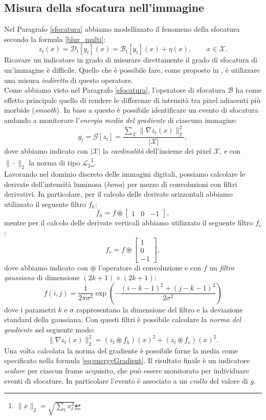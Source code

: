 \subsection{Misura della sfocatura nell'immagine}
Nel Paragrafo \ref{sfocatura} abbiamo modellizzato il fenomeno della sfocatura secondo la formula \eqref{blur_multi}:
\[z_t(x)=\mathcal{D}_t[y_t](x) = \mathcal{B}_t[y_t](x) + \eta(x), \qquad x \in \mathcal{X}.\]
Ricavare un indicatore in grado di misurare direttamente il grado di sfocatura di un'immagine \`e difficile.
Quello che \`e possibile fare, come proposto in \cite{alippi2010detecting}, \`e utilizzare una misura \textit{indiretta} di questo operatore.\\
Come abbiamo visto nel Paragrafo \ref{sfocatura}, l'operatore di sfocatura $\mathcal{B}$ ha come effetto principale quello di rendere le differenze di intensit\`a tra pixel adiacenti pi\`u morbide (\textit{smooth}).
In base a questo \`e possibile identificare un evento di sfocatura andando a monitorare l'\textit{energia media del gradiente} di ciascuna immagine:
\begin{equation}
\label{eq:energyGradient}
g_t = \mathcal{G}[z_t] =\frac{\sum_{\mathcal{X}}\| \nabla z_t(x) \| _2^2 }{|\mathcal{X}|} ,
\end{equation}  
dove abbiamo indicato con $|\mathcal{X}|$ la \textit{cardinalit\`a} dell'insieme dei pixel $\mathcal{X}$, e con $\|\cdot\|_2$ la norma di tipo $\mathcal{L}_2$\footnote{$\|x\|_2=\sqrt{\sum_{t}x_t^2}$}.\\
Lavorando nel dominio discreto delle immagini digitali, possiamo calcolare le derivate dell'intensit\`a luminosa (\textit{luma}) per mezzo di convoluzioni con filtri derivativi.
In particolare, per il calcolo delle derivate orizzontali  abbiamo utilizzato il seguente filtro $f_h$:
\[f_h = f \circledast \left[ \begin{array}{rcl}
1 & 0 & -1
\end{array}\right], \] 
mentre per il calcolo delle derivate verticali  abbiamo utilizzato il seguente filtro $f_v$:
\[f_v = f \circledast \left[ \begin{array}{r}
1 \\ 0 \\ -1
\end{array}\right], \]
dove abbiamo indicato con $\circledast$ l'operatore di convoluzione e con $f$ un \textit{filtro gaussiano} di dimensione $(2k+1) \times (2k+1)$:
\[f(i,j)=\frac{1}{2\pi\sigma^2}\exp\left(-\frac{\left(i-k-1\right)^2+\left(j-k-1\right)^2}{2\sigma^2}\right)\] 
dove i parametri $k$ e $\sigma$ rappresentano la dimensione del filtro e la deviazione standard della gaussiana.
Con questi filtri \`e possibile calcolare la \textit{norma del gradiente} nel seguente modo:
\[\| \nabla z_t(x) \|_2^2=\left(z_t \circledast f_h\right)(x)^2 + \left(z_t \circledast f_v\right)(x)^2.\]
Una volta calcolata la norma del gradiente \`e possibile farne la media come specificato nella formula \eqref{eq:energyGradient}.
Il risultato finale \`e un indicatore \textit{scalare} per ciascun frame acquisito, che pu\`o essere monitorato per individuare eventi di sfocature. 
In particolare l'evento \`e associato a un \textit{crollo} del valore di $g$.
